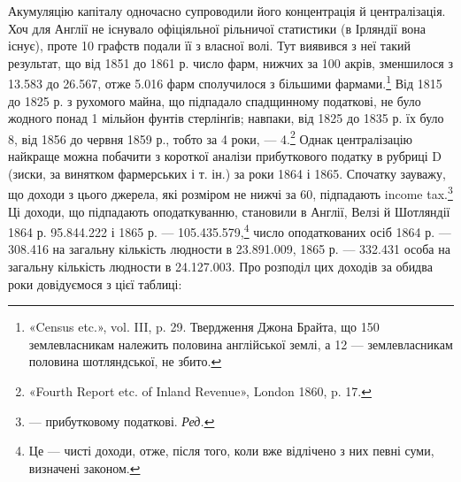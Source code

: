 Акумуляцію капіталу одночасно супроводили його концентрація
й централізація. Хоч для Англії не існувало офіціяльної
рільничої статистики (в Ірляндії вона існує), проте 10 графств подали
її з власної волі. Тут виявився з неї такий результат, що від
1851 до 1861 р. число фарм, нижчих за 100 акрів, зменшилося з
\num{13.583} до \num{26.567}, отже \num{5.016} фарм сполучилося з більшими фармами.\footnote{
«Census etc.», vol. III, p. 29. Твердження Джона Брайта, що 150
землевласникам належить половина англійської землі, а 12 — землевласникам
половина шотляндської, не збито.
}  Від 1815 до 1825 р. з рухомого майна, що підпадало спадщинному
податкові, не було жодного понад 1 мільйон фунтів стерлінґів;
навпаки, від 1825 до 1835 р. їх було 8, від 1856 до червня
1859 р., тобто за 4 роки, — 4.\footnote{
«Fourth Report etc. of Inland Revenue», London 1860, p. 17.
} Однак централізацію найкраще
можна побачити з короткої аналізи прибуткового податку
в рубриці D (зиски, за винятком фармерських і т. ін.) за роки
1864 і 1865. Спочатку зауважу, що доходи з цього джерела,
які розміром не нижчі за 60, підпадають
income tax.\footnote*{
— прибутковому податкові. \emph{Ред.}
} Ці доходи, що підпадають оподаткуванню, становили
в Англії, Велзі й Шотляндії 1864 р. \num{95.844.222}
і 1865 р. — \num{105.435.579},\footnote{
Це — чисті доходи, отже, після того, коли вже відлічено з них
певні суми, визначені законом.
} число оподаткованих
осіб 1864 р. — \num{308.416} на загальну кількість людности в
\num{23.891.009}, 1865 р. — \num{332.431} особа на загальну кількість людности
в \num{24.127.003}. Про розподіл цих доходів за обидва роки
довідуємося з цієї таблиці:
